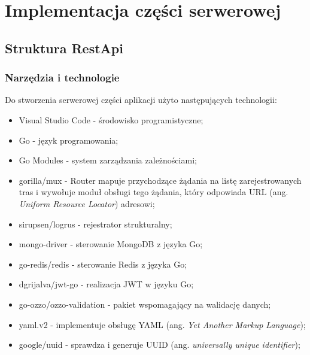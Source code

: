 \section{Implementacja części serwerowej}
% 
\subsection{Struktura RestApi}
% 
\subsubsection{Narzędzia i technologie}
Do stworzenia serwerowej części aplikacji użyto następujących technologii:
\begin{itemize}
\item Visual Studio Code - środowisko programistyczne;
\item Go - język programowania;
\item Go Modules - system zarządzania zależnościami;
\item gorilla/mux - Router mapuje przychodzące żądania na listę zarejestrowanych tras i wywołuje moduł obsługi tego żądania, który odpowiada URL (ang. \textit{Uniform Resource Locator}) adresowi;
\item sirupsen/logrus - rejestrator strukturalny;
\item mongo-driver - sterowanie MongoDB z języka Go;
\item go-redis/redis - sterowanie Redis z języka Go;
\item dgrijalva/jwt-go - realizacja JWT w języku Go;
\item go-ozzo/ozzo-validation - pakiet wspomagający na walidację danych;
\item yaml.v2 - implementuje obsługę YAML (ang. \textit{Yet Another Markup Language});
\item google/uuid - sprawdza i generuje UUID (ang. \textit{universally unique identifier});
\end{itemize}

% 
